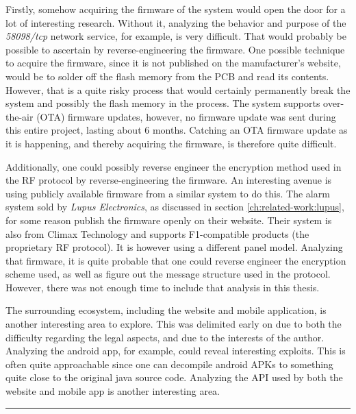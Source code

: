 Firstly, somehow acquiring the firmware of the system would open the door for a lot of interesting research. Without it, analyzing the behavior and purpose of the \textit{58098/tcp} network service, for example, is very difficult. That would probably be possible to ascertain by reverse-engineering the firmware. One possible technique to acquire the firmware, since it is not published on the manufacturer's website, would be to solder off the flash memory from the PCB and read its contents. However, that is a quite risky process that would certainly permanently break the system and possibly the flash memory in the process. The system supports over-the-air (OTA) firmware updates, however, no firmware update was sent during this entire project, lasting about 6 months. Catching an OTA firmware update as it is happening, and thereby acquiring the firmware, is therefore quite difficult.

Additionally, one could possibly reverse engineer the encryption method used in the RF protocol by reverse-engineering the firmware. An interesting avenue is using publicly available firmware from a similar system to do this. The alarm system sold by \textit{Lupus Electronics}, as discussed in section \ref{ch:related-work:lupus}, for some reason publish the firmware openly on their website. Their system is also from Climax Technology and supports F1-compatible products (the proprietary RF protocol). It is however using a different panel model. Analyzing that firmware, it is quite probable that one could reverse engineer the encryption scheme used, as well as figure out the message structure used in the protocol. However, there was not enough time to include that analysis in this thesis.

The surrounding ecosystem, including the website and mobile application, is another interesting area to explore. This was delimited early on due to both the difficulty regarding the legal aspects, and due to the interests of the author. Analyzing the android app, for example, could reveal interesting exploits. This is often quite approachable since one can decompile android APKs to something quite close to the original java source code. Analyzing the API used by both the website and mobile app is another interesting area.

\noindent\rule{\textwidth}{0.4mm}
